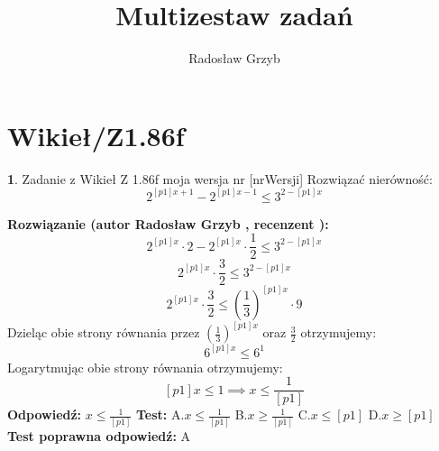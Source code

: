 \documentclass[12pt, a4paper]{article}
\title{Multizestaw zadań}
\author{Radosław Grzyb}
\date{}
\theoremstyle{definition} %
\newtheorem{zad}{}
\newcommand{\kategoria}[1]{\section{#1}} %
\newcommand{\zadStart}[1]{\begin{zad}#1\newline} %
\newcommand{\zadStop}{\end{zad}}   %
\newcommand{\rozwStart}[2]{\noindent \textbf{Rozwiązanie (autor #1 , recenzent #2): }\newline} %
\newcommand{\rozwStop}{\newline}                                            %
\newcommand{\odpStart}{\noindent \textbf{Odpowiedź:}\newline}    %
\newcommand{\odpStop}{\newline}                                             %
\newcommand{\testStart}{\noindent \textbf{Test:}\newline} %
\newcommand{\testStop}{\newline} %
\newcommand{\kluczStart}{\noindent \textbf{Test poprawna odpowiedź:}\newline} %
\newcommand{\kluczStop}{\newline} %
\begin{document}
\maketitle
\kategoria{Wikieł/Z1.86f}
\zadStart{Zadanie z Wikieł Z 1.86f moja wersja nr [nrWersji]}
Rozwiązać nierówność:
$$2^{[p1]x+1}-2^{[p1]x-1}\leq3^{2-[p1]x}$$
\zadStop
\rozwStart{Radosław Grzyb}{}
$$2^{[p1]x}\cdot2-2^{[p1]x}\cdot\frac{1}{2}\leq3^{2-[p1]x}$$
$$2^{[p1]x}\cdot\frac{3}{2}\leq3^{2-[p1]x}$$
$$2^{[p1]x}\cdot\frac{3}{2}\leq\left(\frac{1}{3}\right)^{[p1]x}\cdot9$$
Dzieląc obie strony równania przez $\left(\frac{1}{3}\right)^{[p1]x}$ oraz $\frac{3}{2}$ otrzymujemy:
$$6^{[p1]x}\leq6^{1}$$
Logarytmując obie strony równania otrzymujemy:
$$[p1]x\leq1 \implies x\leq\frac{1}{[p1]}$$
\rozwStop
\odpStart
$x\leq\frac{1}{[p1]}$
\odpStop
\testStart
A.$x\leq\frac{1}{[p1]}$
B.$x\geq\frac{1}{[p1]}$
C.$x \leq [p1]$
D.$x \geq [p1]$
\testStop
\kluczStart
A
\kluczStop
\end{document}
